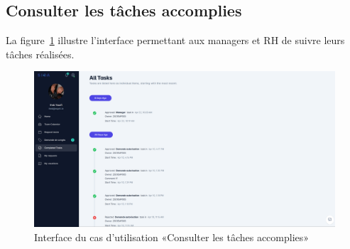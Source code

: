 \subsection{Consulter les tâches accomplies}
La figure~\ref{fig:completed_tasks} illustre l’interface permettant aux managers et RH de suivre leurs tâches réalisées. \\
\begin{figure}[h]
    \centering
    \includegraphics[width=14cm]{images/realisation/completed_tasks.png}
    \caption{Interface du cas d'utilisation «Consulter les tâches accomplies»}
    \label{fig:completed_tasks}
\end{figure}
